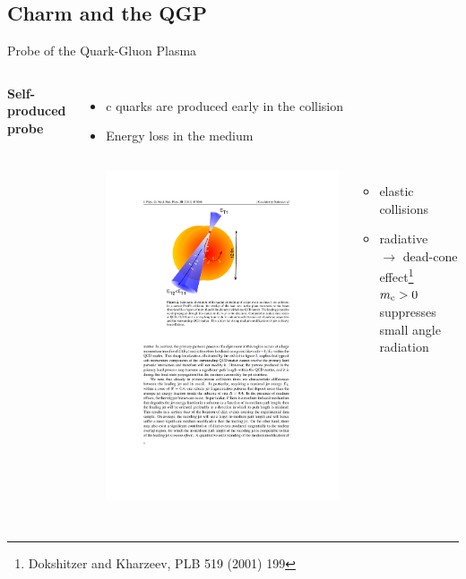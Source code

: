 \documentclass[xcolor={usenames,dvipsnames}]{beamer}
\begin{document}
\subsection{Charm and the QGP}
\begin{frame}{Probe of the Quark-Gluon Plasma}
\begin{columns}
\textbf{\alert{Self-produced probe}}
\begin{itemize}
\item c quarks are \alert{produced early} in the collision
\item Energy loss in the medium
\begin{columns}[T]
\includegraphics[width=\textwidth]{img/jetquenching}
\begin{itemize}
\setlength\itemsep{0em}
\item elastic collisions
\item radiative \\
$\rightarrow$ \alert{dead-cone effect}\footnote[frame,1]{Dokshitzer and Kharzeev, PLB 519 (2001) 199} \\
$m_{\rm c} > 0$ suppresses small angle radiation
\end{itemize}
\end{columns}
\end{itemize}


\end{columns}
\end{frame}
\end{document}

